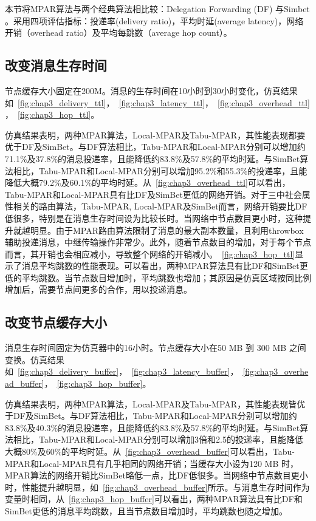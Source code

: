 本节将MPAR算法与两个经典算法相比较：Delegation Forwarding (DF) \cite{Erramilli2008}与Simbet \cite{Daly2007}。采用四项评估指标：投递率(delivery ratio)，平均时延(average latency)，网络开销（overhead ratio）及平均每跳数（average hop count）。



\subsection{改变消息生存时间}

节点缓存大小固定在200M。消息的生存时间在10小时到30小时变化，仿真结果如\figurename~\ref{fig:chap3_delivery_ttl}，\figurename~\ref{fig:chap3_latency_ttl}，\figurename~\ref{fig:chap3_overhead_ttl}，\figurename~\ref{fig:chap3_hop_ttl}。

仿真结果表明，两种MPAR算法，Local-MPAR及Tabu-MPAR，其性能表现都要优于DF及SimBet。与DF算法相比，Tabu-MPAR和Local-MPAR分别可以增加约71.1\%及37.8\%的消息投递率，且能降低约83.8\%及57.8\%的平均时延。与SimBet算法相比，Tabu-MPAR和Local-MPAR分别可以增加95.2\%和55.3\%的投递率，且能降低大概79.2\%及60.1\%的平均时延。从\figurename~\ref{fig:chap3_overhead_ttl}可以看出，Tabu-MPAR和Local-MPAR具有比DF及SimBet更低的网络开销。对于三中社会属性相关的路由算法，Tabu-MPAR, Local-MPAR及SimBet而言，网络开销要比DF低很多，特别是在消息生存时间设为比较长时。当网络中节点数目更小时，这种提升就越明显。由于MPAR路由算法限制了消息的最大副本数量，且利用throwbox辅助投递消息，中继传输操作非常少。此外，随着节点数目的增加，对于每个节点而言，其开销也会相应减小，导致整个网络的开销减小。\figurename~\ref{fig:chap3_hop_ttl}显示了消息平均跳数的性能表现。可以看出，两种MPAR算法具有比DF和SimBet更低的平均跳数。当节点数目增加时，平均跳数也增加；其原因是仿真区域按同比例增加后，需要节点间更多的合作，用以投递消息。



\subsection{改变节点缓存大小}

消息生存时间固定为仿真器中的16小时。节点缓存大小在50 MB 到 300 MB 之间变换。仿真结果如\figurename~\ref{fig:chap3_delivery_buffer}，\figurename~\ref{fig:chap3_latency_buffer}，\figurename~\ref{fig:chap3_overhead_buffer}，\figurename~\ref{fig:chap3_hop_buffer}。

仿真结果表明，两种MPAR算法，Local-MPAR及Tabu-MPAR，其性能表现皆优于DF及SimBet。与DF算法相比，Tabu-MPAR和Local-MPAR分别可以增加约83.8\%及40.3\%的消息投递率，且能降低约83.8\%及57.8\%的平均时延。与SimBet算法相比，Tabu-MPAR和Local-MPAR分别可以增加3倍和2.5的投递率，且能降低大概80\%及60\%的平均时延。从\figurename~\ref{fig:chap3_overhead_buffer}可以看出，Tabu-MPAR和Local-MPAR具有几乎相同的网络开销；当缓存大小设为120 MB 时，MPAR算法的网络开销比SimBet略低一点，比DF低很多。当网络中节点数目更小时，性能提升越明显，如\figurename~\ref{fig:chap3_overhead_buffer}所示。与消息生存时间作为变量时相同，从\figurename~\ref{fig:chap3_hop_buffer}可以看出，两种MPAR算法具有比DF和SimBet更低的消息平均跳数，且当节点数目增加时，平均跳数也随之增加。


